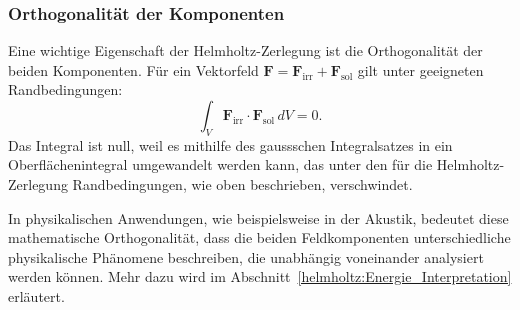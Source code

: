 \subsubsection{Orthogonalität der Komponenten}

Eine wichtige Eigenschaft der Helmholtz-Zerlegung ist die Orthogonalität
der beiden Komponenten.
%
Für ein Vektorfeld
$\boldsymbol{F} = \boldsymbol{F}_{\text{irr}} + \boldsymbol{F}_{\text{sol}}$
gilt unter geeigneten Randbedingungen:
\begin{equation}
\int_V \boldsymbol{F}_{\text{irr}} \cdot \boldsymbol{F}_{\text{sol}} \, dV = 0.
\end{equation}
%
%
Das Integral ist null, weil es mithilfe des gaussschen Integralsatzes
in ein Oberflächenintegral umgewandelt werden kann, das unter den
für die Helmholtz-Zerlegung Randbedingungen, wie oben
beschrieben, verschwindet.
 
In physikalischen Anwendungen, wie beispielsweise in der Akustik,
bedeutet diese mathematische Orthogonalität, dass die beiden
Feldkomponenten unterschiedliche physikalische Phänomene beschreiben,
die unabhängig voneinander analysiert werden können.
Mehr dazu wird im Abschnitt~\ref{helmholtz:Energie_Interpretation}
erläutert.


